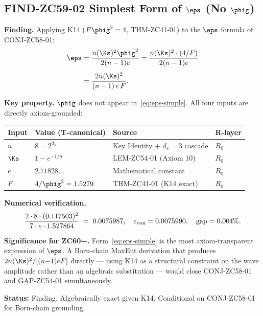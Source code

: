 \documentclass[12pt, a4paper]{article}
\begin{document}
\subsection{FIND-ZC59-02 \quad Simplest Form of $\eps$ (No $\phig$)}
\label{sec:find02}


\begin{derivedbox}[title={FIND-ZC59-02: $\eps = 2n(\Ks)^2/[(n{-}1)eF]$
  --- $\phig$-Free Simplest Form ($R_0$, Exact given K14)}]
\textbf{Finding.}
Applying K14 ($F\phig^2 = 4$, THM-ZC41-01) to the $\eps$
formula of CONJ-ZC58-01:
\begin{align}
  \eps
  &= \frac{n(\Ks)^2\phig^2}{2(n-1)e}
  = \frac{n(\Ks)^2 \cdot (4/F)}{2(n-1)e}
  \nonumber\\[4pt]
  &= \frac{2n(\Ks)^2}{(n-1)\,e\,F}.
  \label{eq:eps-simple}
\end{align}

\textbf{Key property.}
$\phig$ does not appear in~\eqref{eq:eps-simple}.  All four
inputs are directly axiom-grounded:
\begin{center}
{\small
\renewcommand{\arraystretch}{1.25}
\begin{tabular}{@{}llll@{}}
\toprule
Input & Value (T-canonical) & Source & R-layer \\
\midrule
$n$ & $8 = 2^{d_s}$ & Key Identity + $d_s=3$ cascade & $R_0$ \\
$\Ks$ & $1-e^{-1/n}$ & LEM-ZC54-01 (Axiom 10) & $R_0$ \\
$e$ & $2.71828\ldots$ & Mathematical constant & $R_0$ \\
$F$ & $4/\phig^2 = 1.5279$ & THM-ZC41-01 (K14 exact) & $R_0$ \\
\bottomrule
\end{tabular}
}
\end{center}

\textbf{Numerical verification.}
\[
  \frac{2 \cdot 8 \cdot (0.117503)^2}{7 \cdot e \cdot 1.527864}
  \;=\; 0.0075987,
  \quad \varepsilon_{\rm can} = 0.0075990,
  \quad \text{gap} = 0.004\%.
\]

\textbf{Significance for ZC60+.}
Form~\eqref{eq:eps-simple} is the most axiom-transparent
expression of $\eps$.  A Born-chain MaxEnt derivation that
produces $2n(\Ks)^2/[(n{-}1)eF]$ directly --- using K14 as a
structural constraint on the wave amplitude rather than an
algebraic substitution --- would close CONJ-ZC58-01 and
GAP-ZC54-01 simultaneously.

\textbf{Status:} Finding.  Algebraically exact given K14.
Conditional on CONJ-ZC58-01 for Born-chain grounding.
\end{derivedbox}
\end{document}
